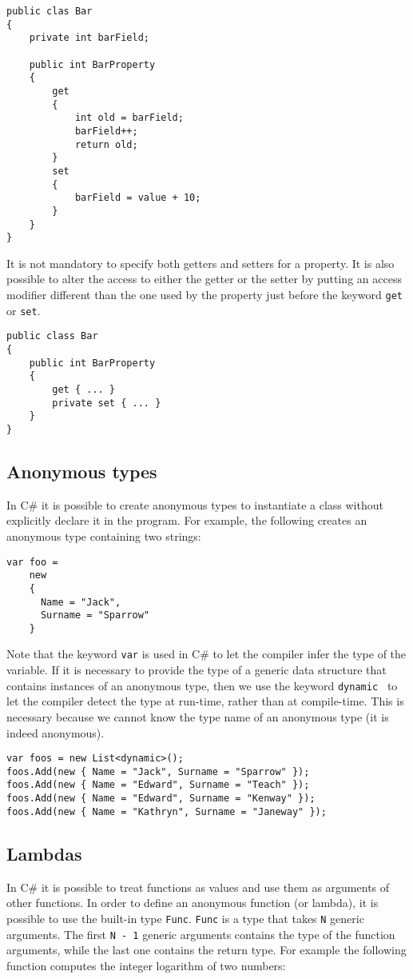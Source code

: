 \begin{lstlisting}
public clas Bar
{
	private int barField;
	
	public int BarProperty
	{
		get
		{
			int old = barField;
			barField++;
			return old;
		}
		set
		{
			barField = value + 10;
		}
	}
}
\end{lstlisting}

\noindent
It is not mandatory to specify both getters and setters for a property. It is also possible to alter the access to either the getter or the setter by putting an access modifier different than the one used by the property just before the keyword \texttt{get} or \texttt{set}.

\begin{lstlisting}
public class Bar
{
	public int BarProperty
	{
		get { ... }
		private set { ... } 
	}
}
\end{lstlisting}

\subsection{Anonymous types}
In C\# it is possible to create anonymous types to instantiate a class without explicitly declare it in the program. For example, the following creates an anonymous type containing two strings:

\begin{lstlisting}
var foo =
	new
	{
	  Name = "Jack",
	  Surname = "Sparrow"
	}
\end{lstlisting}

\noindent
Note that the keyword \texttt{var} is used in C\# to let the compiler infer the type of the variable. If it is necessary to provide the type of a generic data structure that contains instances of an anonymous type, then we use the keyword \texttt{dynamic } to let the compiler detect the type at run-time, rather than at compile-time. This is necessary because we cannot know the type name of an anonymous type (it is indeed anonymous).

\begin{lstlisting}
var foos = new List<dynamic>();
foos.Add(new { Name = "Jack", Surname = "Sparrow" });
foos.Add(new { Name = "Edward", Surname = "Teach" });
foos.Add(new { Name = "Edward", Surname = "Kenway" });
foos.Add(new { Name = "Kathryn", Surname = "Janeway" });
\end{lstlisting}

\subsection{Lambdas}
In C\# it is possible to treat functions as values and use them as arguments of other functions. In order to define an anonymous function (or lambda), it is possible to use the built-in type \texttt{Func}. \texttt{Func} is a type that takes \texttt{N} generic arguments. The first \texttt{N - 1} generic arguments contains the type of the function arguments, while the last one contains the return type. For example the following function computes the integer logarithm of two numbers:

